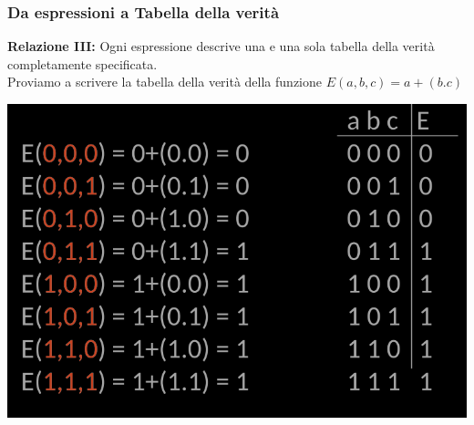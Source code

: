 \documentclass{article}
\begin{document}
\subsubsection{Da espressioni a Tabella della verità}
\textbf{Relazione III:} Ogni espressione descrive una e una sola tabella della verità completamente specificata.
\vspace{0.3cm}\\
Proviamo a scrivere la tabella della verità della funzione $E(a,b,c) = a +(b.c)$
\begin{center}
    \includegraphics[scale=0.44]{tdv1.png}
\end{center}
\end{document}
